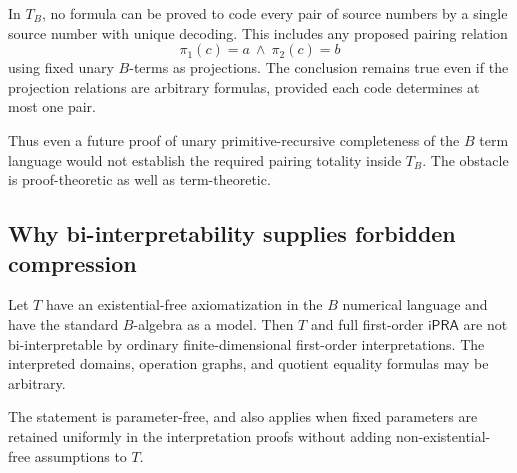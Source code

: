 \begin{corollary}
\label{rel:no-scalar-pairing}
In $T_B$, no formula can be proved to code every pair of source numbers
by a single source number with unique decoding. This includes any
proposed pairing relation
\[
                         \pi_1(c)=a\ \wedge\ \pi_2(c)=b
\]
using fixed unary $B$-terms as projections. The conclusion remains true
even if the projection relations are arbitrary formulas, provided each
code determines at most one pair.
\end{corollary}

Thus even a future proof of unary primitive-recursive completeness of
the $B$ term language would not establish the required pairing totality
inside $T_B$. The obstacle is proof-theoretic as well as term-theoretic.

\subsection{Why bi-interpretability supplies forbidden compression}

\begin{theorem}
\label{rel:no-biinterpretation}
Let $T$ have an existential-free axiomatization in the $B$ numerical
language and have the standard $B$-algebra as a model. Then $T$ and full
first-order $\mathsf{iPRA}$ are not bi-interpretable by ordinary
finite-dimensional first-order interpretations. The interpreted domains,
operation graphs, and quotient equality formulas may be arbitrary.

The statement is parameter-free, and also applies when fixed parameters
are retained uniformly in the interpretation proofs without adding
non-existential-free assumptions to $T$.
\end{theorem}

